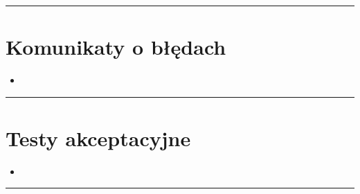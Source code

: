 \documentclass[a4paper,11pt]{article}
\newcommand{\linia}{\rule{\linewidth}{0.4mm}}
\begin{document}
\noindent\linia
\section{Komunikaty o błędach}
\begin{itemize}
\item 
\end{itemize}

\noindent\linia
\section{Testy akceptacyjne}

\begin{itemize}
\item 

\end{itemize}

\noindent\linia
\end{document}
